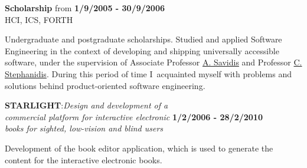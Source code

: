 \documentclass[10pt]{article}
\newenvironment{outerlist}[1][\enskip\textbullet]%
        {\begin{itemize}[#1]}{\end{itemize}%
         \vspace{-.6\baselineskip}}
\newenvironment{innerlist}[1][\enskip\textbullet]%
        {\begin{compactitem}[#1]}{\end{compactitem}}
\begin{document}
\begin{outerlist}
        
        \item[] \textbf{Scholarship} from \hfill \textbf{1/9/2005 - 30/9/2006}\\
\ac{HCI}, \ac{ICS}, \ac{FORTH} 
        \begin{innerlist}
                \item Undergraduate and postgraduate scholarships. Studied and applied Software Engineering in the context of developing and shipping universally accessible software, under the supervision of Associate Professor \href{mailto:as@ics.forth.gr}{A. Savidis} and Professor \href{mailto:cs@ics.forth.gr}{C. Stephanidis}. During this period of time I\ acquainted myself with problems and solutions behind product-oriented software engineering.
        \end{innerlist}

                \item[] \textbf{STARLIGHT}:\textit{Design and development of a}\\
                                            \textit{commercial platform for interactive electronic} \hfill \textbf{\textbf{1/2/2006 - 28/2/2010}}\\
                                            \textit{books for sighted, low-vision and blind users}
        \begin{innerlist}
                \item Development of the book editor application, which is used to generate the content for the interactive electronic books.
        \end{innerlist}
        
\end{outerlist}
\end{document}
